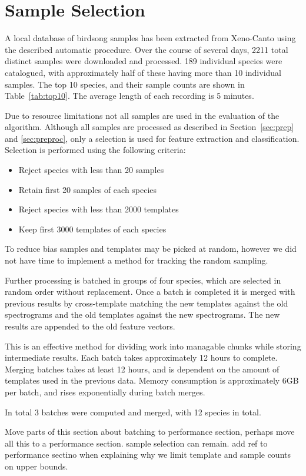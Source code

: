 \section{Sample Selection}
A local database of birdsong samples has been extracted from Xeno-Canto using
the described automatic procedure.
Over the course of several days, 2211 total distinct samples were downloaded and
processed.
189 individual species were catalogued, with approximately half of these having
more than 10 individual samples.
The top 10 species, and their sample counts are shown in Table~\ref{tab:top10}.
The average length of each recording is 5 minutes.

Due to resource limitations not all samples are used in the evaluation of the
algorithm.
Although all samples are processed as described in Section~\ref{sec:prep} and
\ref{sec:preproc}, only a selection is used for feature extraction and
classification.
Selection is performed using the following criteria:
\begin{itemize}
  \item Reject species with less than 20 samples
  \item Retain first 20 samples of each species
  \item Reject species with less than 2000 templates
  \item Keep first 3000 templates of each species
\end{itemize}
To reduce bias samples and templates may be picked at random, however
we did not have time to implement a method for tracking the random sampling.

Further processing is batched in groups of four species, which are selected in
random order without replacement.
Once a batch is completed it is merged with previous results by cross-template
matching the new templates against the old spectrograms and the old templates
against the new spectrograms.
The new results are appended to the old feature vectors.

This is an effective method for dividing work into managable chunks while storing
intermediate results.
Each batch takes approximately 12 hours to complete.
Merging batches takes at least 12 hours, and is dependent on the amount of
templates used in the previous data.
Memory consumption is approximately 6GB per batch, and rises exponentially
during batch merges.

In total 3 batches were computed and merged, with 12 species in total.

Move parts of this section about batching to performance section,
perhaps move all this to a performance section. sample selection can remain.
add ref to performance sectino when explaining why we limit template and
sample counts on upper bounds.


